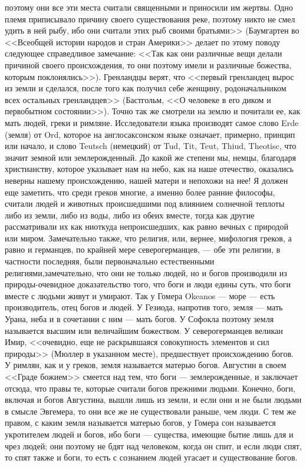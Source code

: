 \documentclass[12pt]{article}
\begin{document}
поэтому они все эти места считали священными и приносили им жертвы. Одно племя приписывало причину своего существования реке, поэтому никто не смел удить в ней рыбу, ибо они считали этих рыб своими братьями>> (Баумгартен во <<Всеобщей истории народов и стран Америки>> делает по этому поводу следующее справедливое замечание: <<Так как они различные вещи делали причиной своего происхождения, то они поэтому имели и различные божества, которым поклонялись>>). Гренландцы верят, что <<первый гренландец вырос из земли и сделался, после того как получил себе женщину, родоначальником всех остальных гренландцев>> (Бастгольм, <<О человеке в его диком и первобытном состоянии>>). Точно так же смотрели на землю и почитали ее, как мать людей, греки и римляне. Исследователи языка производят самое слово Erde (земля) от Ord, которое на англосаксонском языке означает, примерно, принцип или начало, и слово Teutsch (немецкий) от Tud, Tit, Teut, Thiud, Theotisc, что значит земной или землерожденный. До какой же степени мы, немцы, благодаря христианству, которое указывает нам на небо, как на наше отечество, оказались неверны нашему происхождению, нашей матери и непохожи на нее! Я должен еще заметить, что среди греков многие, а именно более ранние философы, считали людей и животных происшедшими под влиянием солнечной теплоты либо из земли, либо из воды, либо из обеих вместе, тогда как другие рассматривали их как ниоткуда непроисшедших, как равно вечных с природой или миром. Замечательно также, что религия, или, вернее, мифология греков, а равно и германцев, по крайней мере северогерманцев, --- обе эти религии, в частности последняя, были первоначально естественными религиями,замечательно, что они не только людей, но и богов производили из природы-очевидное доказательство того, что боги и люди едины суть, что боги вместе с людьми живут и умирают. Так у Гомера Okeanos --- море --- есть производитель, отец богов и людей. У Гезиода, напротив того, земля --- мать Урана, неба и в сочетании с ним --- мать богов. У Софокла поэтому земля называется высшим или величайшим божеством. У северогерманцев великан Имир, <<очевидно, еще не раскрывшаяся совокупность элементов и сил природы>> (Мюллер в указанном месте), предшествует происхождению богов. У римлян, как и у греков, земля называется матерью богов. Августин в своем <<Граде божием>> смеется над тем, что боги --- землерожденные, и заключает отсюда, что правы те, которые считали богов прежними людьми. Конечно, боги, включая и богов Августина, вышли лишь из земли, и если они и не были людьми в смысле Эвгемера, то они все же не существовали раньше, чем люди. С тем же правом, с каким земля называется матерью богов, у Гомера сон называется укротителем людей и богов, ибо боги --- существа, имеющие бытие лишь для и чрез людей; они поэтому не бдят над человеком, когда он спит, и если люди спят, то спят также и боги, то есть с сознанием людей угасает и существование богов. 
\end{document}
